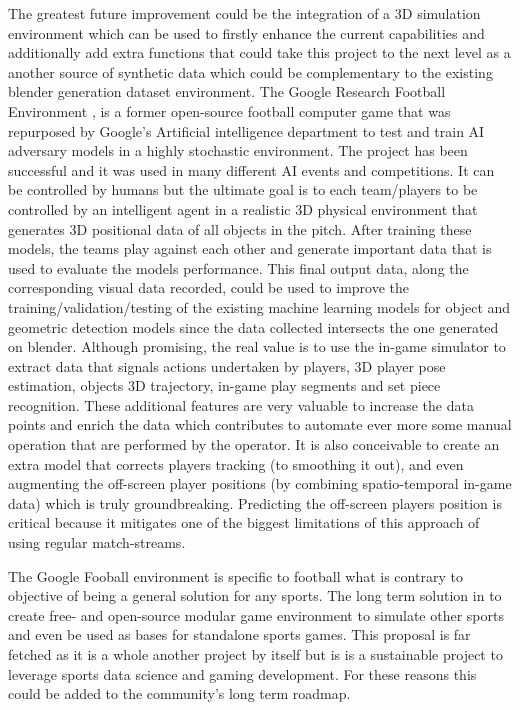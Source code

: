 \documentclass[
    11pt,
    oneside
]{report}
\begin{document}
The greatest future improvement could be the integration of a 3D simulation environment which can be used to firstly enhance the current capabilities and additionally add extra functions that could take this project to the next level as a another source of synthetic data which could be complementary to the existing blender generation dataset environment. The Google Research Football Environment \cite{gfootball_env}, is a former open-source football computer game that was repurposed by Google's Artificial intelligence department to test and train AI adversary models in a highly stochastic environment. The project has been successful and it was used in many different AI events and competitions. It can be controlled by humans but the ultimate goal is to each team/players to be controlled by an intelligent agent in a realistic 3D physical environment that generates 3D positional data of all objects in the pitch. After training these models, the teams play against each other and generate important data that is used to evaluate the models performance. This final output data, along the corresponding visual data recorded, could be used to improve the training/validation/testing of the existing machine learning models for object and geometric detection models since the data collected intersects the one generated on blender. Although promising, the real value is to use the in-game simulator to extract data that signals actions undertaken by players, 3D player pose estimation, objects 3D trajectory, in-game play segments and set piece recognition. These additional features are very valuable to increase the data points and enrich the data which contributes to automate ever more some manual operation that are performed by the operator. It is also conceivable to create an extra model that corrects players tracking (to smoothing it out), and even augmenting the off-screen player positions (by combining spatio-temporal in-game data) which is truly groundbreaking. Predicting the off-screen players position is critical because it mitigates one of the biggest limitations of this approach of using regular match-streams.


The Google Fooball environment \cite{gfootball_env} is specific to football what is contrary to objective of being a general solution for any sports. The long term solution in to create free- and open-source modular game environment to simulate other sports and even be used as bases for standalone sports games. This proposal is far fetched as it is a whole another project by itself but is is a sustainable project to leverage sports data science and gaming development. For these reasons this could be added to the community's long term roadmap.
\end{document}
